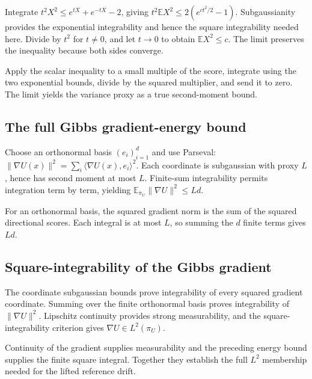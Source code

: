 \documentclass[11pt,a4paper]{report}
\begin{document}
Integrate \(t^2X^2\le e^{tX}+e^{-tX}-2\), giving \(t^2\mathbb EX^2\le2(e^{ct^2/2}-1)\). Subgaussianity provides the exponential integrability and hence the square integrability needed here. Divide by \(t^2\) for \(t\ne0\), and let \(t\to0\) to obtain \(\mathbb EX^2\le c\). The limit preserves the inequality because both sides converge.



Apply the scalar inequality to a small multiple of the score, integrate using the two exponential bounds, divide by the squared multiplier, and send it to zero. The limit yields the variance proxy as a true second-moment bound.

\subsection{\texorpdfstring{The full Gibbs gradient-energy bound}{The full Gibbs gradient-energy bound}}
\label{report-step-UnadjustedLangevin-GibbsScore-lean-6}


Choose an orthonormal basis \((e_i)_{i=1}^d\) and use Parseval: \(\|\nabla U(x)\|^2=\sum_i\langle\nabla U(x),e_i\rangle^2\). Each coordinate is subgaussian with proxy \(L\), hence has second moment at most \(L\). Finite-sum integrability permits integration term by term, yielding \(\mathbb E_{\pi_U}\|\nabla U\|^2\le Ld\).



For an orthonormal basis, the squared gradient norm is the sum of the squared directional scores. Each integral is at most \(L\), so summing the \(d\) finite terms gives \(Ld\).

\subsection{\texorpdfstring{Square-integrability of the Gibbs gradient}{Square-integrability of the Gibbs gradient}}
\label{report-step-UnadjustedLangevin-GibbsScore-lean-7}


The coordinate subgaussian bounds prove integrability of every squared gradient coordinate. Summing over the finite orthonormal basis proves integrability of \(\|\nabla U\|^2\). Lipschitz continuity provides strong measurability, and the square-integrability criterion gives \(\nabla U\in L^2(\pi_U)\).



Continuity of the gradient supplies measurability and the preceding energy bound supplies the finite square integral. Together they establish the full \(L^2\) membership needed for the lifted reference drift.
\end{document}

